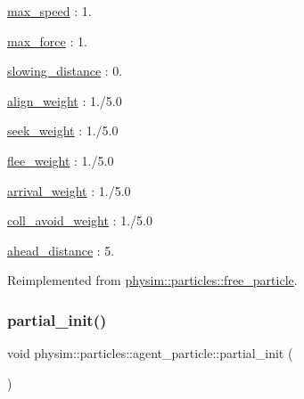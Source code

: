 \begin{DoxyItemize}
\item \hyperlink{classphysim_1_1particles_1_1agent__particle_a3e34a9a7fc82cbad0226b7b925b5ba22}{max\+\_\+speed} \+: 1.
\item \hyperlink{classphysim_1_1particles_1_1agent__particle_a57909cb85564f4432754000ed570d88a}{max\+\_\+force} \+: 1.
\item \hyperlink{classphysim_1_1particles_1_1agent__particle_a1c3e4357a84047b45ea827a2e90cd14b}{slowing\+\_\+distance} \+: 0.
\item \hyperlink{classphysim_1_1particles_1_1agent__particle_a119da4916df4f5c52f13170725295f20}{align\+\_\+weight} \+: 1./5.0
\item \hyperlink{classphysim_1_1particles_1_1agent__particle_a853c72c7dbd902a126af1a90d50af222}{seek\+\_\+weight} \+: 1./5.0
\item \hyperlink{classphysim_1_1particles_1_1agent__particle_ad7824cd0742b42f803542d8b4d5eae98}{flee\+\_\+weight} \+: 1./5.0
\item \hyperlink{classphysim_1_1particles_1_1agent__particle_aaeb579f8b30b7604d7205bb7aff5197b}{arrival\+\_\+weight} \+: 1./5.0
\item \hyperlink{classphysim_1_1particles_1_1agent__particle_acf2c406d0b41c07d3f786701dec35020}{coll\+\_\+avoid\+\_\+weight} \+: 1./5.0
\item \hyperlink{classphysim_1_1particles_1_1agent__particle_ab08a6b3f3a8f27b3281d981146135234}{ahead\+\_\+distance} \+: 5. 
\end{DoxyItemize}

Reimplemented from \hyperlink{classphysim_1_1particles_1_1free__particle_a0df21e64a28c5fdf471d54a50b59fea3}{physim\+::particles\+::free\+\_\+particle}.

\mbox{\label{classphysim_1_1particles_1_1agent__particle_af48f594a16ab6c2ff3b475fa7f64266c}} 
\subsubsection{\texorpdfstring{partial\+\_\+init()}{partial\_init()}}
{\footnotesize\ttfamily void physim\+::particles\+::agent\+\_\+particle\+::partial\+\_\+init (\begin{DoxyParamCaption}{ }\end{DoxyParamCaption})\hspace{0.3cm}{\ttfamily [private]}}



